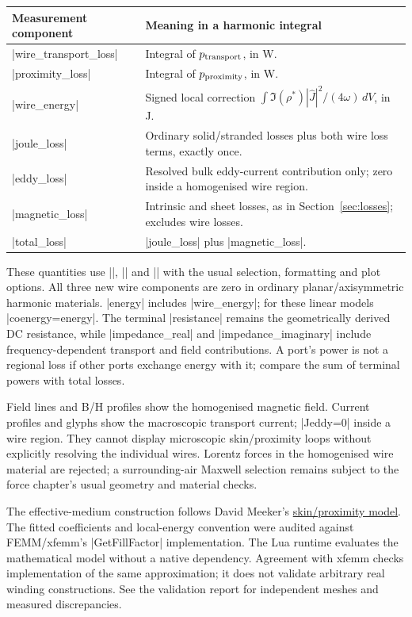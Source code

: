 \begin{center}
\begin{tabular}{lp{.64\linewidth}}
\toprule Measurement component & Meaning in a harmonic integral\\
\midrule
|wire_transport_loss| & Integral of $p_{\rm transport}$, in W.\\
|proximity_loss| & Integral of $p_{\rm proximity}$, in W.\\
|wire_energy| & Signed local correction $\int\Im(\rho^*)|\widehat J|^2/(4\omega)\,dV$, in J.\\
|joule_loss| & Ordinary solid/stranded losses plus both wire loss terms, exactly once.\\
|eddy_loss| & Resolved bulk eddy-current contribution only; zero inside a homogenised wire region.\\
|magnetic_loss| & Intrinsic and sheet losses, as in Section~\ref{sec:losses}; excludes wire losses.\\
|total_loss| & |joule_loss| plus |magnetic_loss|.\\
\bottomrule
\end{tabular}
\end{center}
These quantities use |\femmmeasure|, |\femmvalue| and |\femmresultplot| with the
usual selection, formatting and plot options. All three new wire components
are zero in ordinary planar/axisymmetric harmonic materials. |energy| includes
|wire_energy|; for these linear models |coenergy=energy|. The terminal
|resistance| remains the geometrically derived DC resistance, while
|impedance_real| and |impedance_imaginary| include frequency-dependent transport
and field contributions. A port's power is not a regional loss if other ports
exchange energy with it; compare the sum of terminal powers with total losses.

Field lines and B/H profiles show the homogenised magnetic field. Current
profiles and glyphs show the macroscopic transport current; |Jeddy=0| inside
a wire region. They cannot display microscopic skin/proximity loops without
explicitly resolving the individual wires. Lorentz forces in the homogenised
wire material are rejected; a surrounding-air Maxwell selection remains subject
to the force chapter's usual geometry and material checks.

The effective-medium construction follows David Meeker's
\href{https://www.femm.info/doku/doku.php?id=proximityloss}{skin/proximity model}.
The fitted coefficients and local-energy convention were audited against
FEMM/xfemm's |GetFillFactor| implementation. The Lua runtime evaluates the
mathematical model without a native dependency. Agreement with xfemm checks
implementation of the same approximation; it does not validate arbitrary real
winding constructions. See the validation report for independent meshes and
measured discrepancies.

